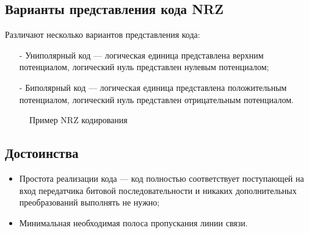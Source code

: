 \documentclass[a4paper14pt]{article}
\begin{document}
\subsection{Варианты представления кода NRZ}
Различают несколько вариантов представления кода:
\begin{itemize}
    \item[-]Униполярный код — логическая единица представлена верхним потенциалом, логический нуль представлен нулевым потенциалом;    
    \item[-]Биполярный код — логическая единица представлена положительным потенциалом, логический нуль представлен отрицательным потенциалом.
\end{itemize}
\begin{figure}[h]
    \caption{Пример NRZ кодирования}
\end{figure}
\newpage
\subsection{Достоинства}
\begin{itemize}
    \item Простота реализации кода — код полностью соответствует поступающей на вход передатчика битовой последовательности и никаких дополнительных преобразований выполнять не нужно; 
    \item Минимальная необходимая полоса пропускания линии связи. 
\end{itemize}
\end{document}
